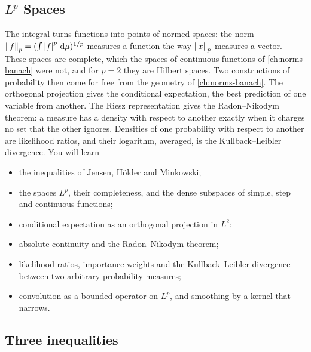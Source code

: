 \begin{notechapter}
\chapter{$L^p$ Spaces}
\label{ch:lp-spaces}

\begin{chapterintro}
The integral turns functions into points of normed spaces: the norm
$\left\|f\right\|_p = (\int\left|f\right|^p\,\mathrm{d}\mu)^{1/p}$ measures a function the way
$\left\|x\right\|_p$ measures a vector. These spaces are complete, which the
spaces of continuous functions of \cref{ch:norms-banach} were not, and
for $p = 2$ they are Hilbert spaces. Two constructions of probability
then come for free from the geometry of \cref{ch:norms-banach}. The
orthogonal projection gives the conditional expectation, the best
prediction of one variable from another. The Riesz representation gives
the Radon--Nikodym theorem: a measure has a density with respect to
another exactly when it charges no set that the other ignores. Densities
of one probability with respect to another are likelihood ratios, and
their logarithm, averaged, is the Kullback--Leibler divergence. You will
learn
\begin{itemize}[nosep]
  \item the inequalities of Jensen, H\"older and Minkowski;
  \item the spaces $L^p$, their completeness, and the dense subspaces of
        simple, step and continuous functions;
  \item conditional expectation as an orthogonal projection in $L^2$;
  \item absolute continuity and the Radon--Nikodym theorem;
  \item likelihood ratios, importance weights and the Kullback--Leibler
        divergence between two arbitrary probability measures;
  \item convolution as a bounded operator on $L^p$, and smoothing by a
        kernel that narrows.
\end{itemize}
\end{chapterintro}

\section{Three inequalities}\label{lp-spaces:sec:inequalities}


\end{notechapter}
